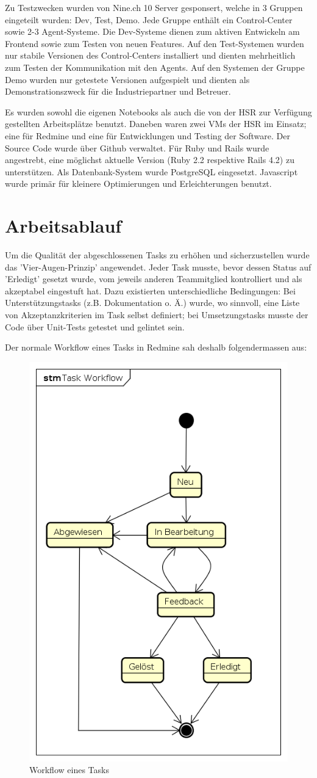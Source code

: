 Zu Testzwecken wurden von Nine.ch 10 Server gesponsert, welche  in 3 Gruppen eingeteilt wurden: Dev, Test, Demo. Jede Gruppe enthält ein Control-Center sowie 2-3 Agent-Systeme. Die Dev-Systeme dienen zum aktiven Entwickeln am Frontend sowie zum Testen von neuen Features. Auf den Test-Systemen wurden nur stabile Versionen des Control-Centers installiert und dienten mehrheitlich zum Testen der Kommunikation mit den Agents. Auf den Systemen der Gruppe Demo wurden nur getestete Versionen aufgespielt und dienten als Demonstrationszweck für die Industriepartner und Betreuer.

Es wurden sowohl die eigenen Notebooks als auch die von der HSR zur Verfügung gestellten Arbeitsplätze benutzt. Daneben waren zwei VMs der HSR im Einsatz; eine für Redmine und eine für Entwicklungen und Testing der Software. Der Source Code wurde über Github verwaltet.
Für Ruby und Rails wurde angestrebt, eine möglichst aktuelle Version (Ruby 2.2 respektive Rails 4.2) zu unterstützen. Als Datenbank-System wurde PostgreSQL eingesetzt. Javascript wurde primär für kleinere Optimierungen und Erleichterungen benutzt.

\clearpage
\section{Arbeitsablauf}

Um die Qualität der abgeschlossenen Tasks zu erhöhen und sicherzustellen wurde das 'Vier-Augen-Prinzip' angewendet. Jeder Task musste, bevor dessen Status auf 'Erledigt' gesetzt wurde, vom jeweils anderen Teammitglied kontrolliert und als akzeptabel eingestuft hat. Dazu existierten unterschiedliche Bedingungen: Bei Unterstützungstasks (z.B. Dokumentation o. Ä.) wurde, wo sinnvoll, eine Liste von Akzeptanzkriterien im Task selbst definiert; bei Umsetzungstasks musste der Code über Unit-Tests getestet und gelintet sein.

Der normale Workflow eines Tasks in Redmine sah deshalb folgendermassen aus:

\begin{figure}[H]
	\centering
	\includegraphics[width=0.5\linewidth]{fig/task_workflow}
	\caption{Workflow eines Tasks}
	\label{fig:pm:workflow}
\end{figure}


